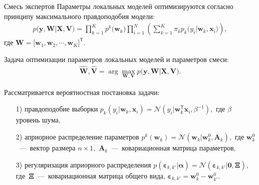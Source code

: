 \documentclass[9pt,pdf,hyperref={unicode}]{beamer}
\begin{document}
\begin{frame}{Смесь экспертов}
\justifying
Параметры локальных моделей оптимизируются согласно принципу максимального правдоподобия модели:
\begin{equation*}
\begin{aligned}
p\bigr(\mathbf{y}, \mathbf{W}|\mathbf{X}, \mathbf{V}\bigr) = \prod_{k=1}^{K}p^{k}\bigr(\mathbf{w}_k\bigr)\prod_{i=1}^{N}\left(\sum_{k=1}^{K}\pi_{k}p_{k}\bigr(y_i|\mathbf{w}_k, \mathbf{x}_i\bigr)\right),
\end{aligned}
\end{equation*}
где $\mathbf{W} = \bigr[\mathbf{w}_1, \mathbf{w}_2, \cdots, \mathbf{w}_K\bigr]^{\mathsf{T}}.$

Задача оптимизации параметров локальных моделей и параметров смеси:
\begin{equation*}
\begin{aligned}
\hat{\mathbf{W}}, \hat{\mathbf{V}} = \arg\max_{\mathbf{W}, \mathbf{V}} p\bigr(\mathbf{y}, \mathbf{W}|\mathbf{X}, \mathbf{V}\bigr).
\end{aligned}
\end{equation*}

Рассматривается вероятностная постановка задачи:
\begin{enumerate}
	\item[1)] правдоподобие выборки $p_{k}\left(y_{i}|\mathbf{w}_{k}, \mathbf{x}_{i}\right) = \mathcal{N}\left(y_{i}|\mathbf{w}_{k}^{\mathsf{T}}\mathbf{x}_{i}, \beta^{-1}\right),$ где $\beta$ уровень шума,
	\item[2)] априорное распределение параметров $p^{k}\left(\mathbf{w}_{k}\right) = \mathcal{N}\left(\mathbf{w}_{k}|\mathbf{w}^{0}_{k}, \mathbf{A}_{k}\right),$ где $\mathbf{w}^{0}_{k}$~---~вектор размера $n\times1,$ $\mathbf{A}_{k}$~---~ковариационная матрица параметров,
	\item[3)] регуляризация априорного распределения $p\left(\bm{\varepsilon}_{k,k'}|\bm{\alpha}\right) = \mathcal{N}\left(\bm{\varepsilon}_{k,k'}|\mathbf{0},  \bm{\Xi}\right),$ где~$\bm{\Xi}$~---~ковариационная матрица общего вида, $\bm{\varepsilon}_{k,k'} = \mathbf{w}_{k}^{0}-\mathbf{w}_{k'}^{0}.$
\end{enumerate}

\end{frame}
\end{document}
